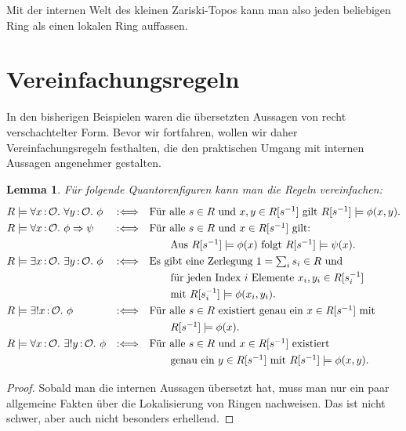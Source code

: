 \documentclass[a4paper,ngerman,12pt]{scrartcl}
\theoremstyle{definition}
\theoremstyle{plain}
\newtheorem{lemma}[defn]{Lemma}
\theoremstyle{remark}
\renewcommand{\O}{\mathcal{O}}
\renewcommand{\_}{\mathpunct{.}\,}
\newcommand{\?}{\,{:}\,}
\begin{document}
Mit der internen Welt des kleinen Zariski-Topos kann man also jeden
beliebigen Ring als einen lokalen Ring auffassen.


\section{Vereinfachungsregeln}

In den bisherigen Beispielen waren die übersetzten Aussagen
von recht verschachtelter Form. Bevor wir fortfahren, wollen wir daher
Vereinfachungsregeln festhalten, die den praktischen Umgang mit internen
Aussagen angenehmer gestalten.

\begin{lemma}\label{vereinfachung}%
Für folgende Quantorenfiguren kann man die Regeln vereinfachen:
\[\renewcommand{\arraystretch}{1.3}\begin{array}{@{}lcl@{}}
  R \models \forall x\?\O\_ \forall y\?\O\_ \phi &\Ll&
    \text{Für alle~$s \in R$ und~$x,y \in R[s^{-1}]$ gilt~$R[s^{-1}] \models
    \phi(x,y)$.} \\
  R \models \forall x\?\O\_ \phi \Rightarrow \psi &\Ll&
    \text{Für alle~$s \in R$ und~$x \in R[s^{-1}]$ gilt:} \\
  &&{\quad\quad} \text{Aus $R[s^{-1}] \models \phi(x)$ folgt $R[s^{-1}] \models \psi(x)$.} \\
  R \models \exists x\?\O\_ \exists y\?\O\_ \phi &\Ll&
    \text{Es gibt eine Zerlegung~$1 = \sum_i s_i \in R$ und} \\
  &&{\quad\quad} \text{für jeden Index~$i$ Elemente~$x_i, y_i \in R[s_i^{-1}]$} \\
  &&{\quad\quad} \text{mit $R[s_i^{-1}] \models \phi(x_i,y_i)$.} \\
  R \models \exists!x \? \O\_ \phi &\Ll&
    \text{Für alle~$s \in R$ existiert genau ein~$x \in R[s^{-1}]$ mit} \\
  &&{\quad\quad} R[s^{-1}] \models \phi(x). \\
  R \models \forall x\?\O\_ \exists! y\?\O\_ \phi &\Ll&
    \text{Für alle~$s \in R$ und~$x \in R[s^{-1}]$ existiert} \\
  &&{\quad\quad} \text{genau ein~$y \in R[s^{-1}]$ mit $R[s^{-1}] \models
  \phi(x,y)$.}
\end{array}\]
\end{lemma}
\begin{proof}Sobald man die internen Aussagen übersetzt hat, muss man nur ein
paar allgemeine Fakten über die Lokalisierung von Ringen nachweisen. Das ist
nicht schwer, aber auch nicht besonders erhellend.\end{proof}
\end{document}
